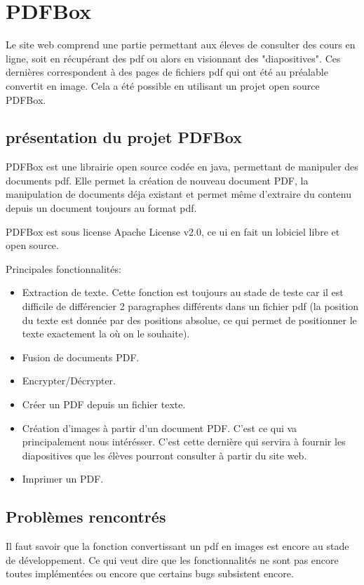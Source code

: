 \chapter{PDFBox}
    Le site web comprend une partie permettant aux éleves de consulter des cours en ligne, 
soit en récupérant des pdf ou alors en visionnant des "diapositives". Ces dernières 
correspondent à des pages de fichiers pdf qui ont été au préalable convertit en image. 
Cela a été possible en utilisant un projet open source PDFBox.
	

	\section{présentation du projet PDFBox}
	PDFBox est une librairie open source codée en java, permettant de manipuler 
des documents pdf. Elle permet la création de nouveau document PDF, la manipulation 
de documents déja existant et permet même d'extraire du contenu depuis un document 
toujours au format pdf.

	PDFBox est sous license Apache License v2.0, ce ui en fait un lobiciel libre et open source.

	Principales fonctionnalités:
	\begin{itemize}
		\item Extraction de texte.
			Cette fonction est toujours au stade de teste car il est difficile de différencier 2 paragraphes différents dans un fichier pdf (la position du texte est donnée par des positions absolue, ce qui permet de positionner le texte exactement la où on le souhaite).  
		\item Fusion de documents PDF. 
		\item Encrypter/Décrypter.
		\item Créer un PDF depuis un fichier texte.
		\item Création d'images à partir d'un document PDF. C'est ce qui va 
              principalement nous intérésser. C'est cette dernière qui servira à 
              fournir les diapositives que les élèves pourront consulter à partir 
              du site web.
		\item Imprimer un PDF.
	\end{itemize}


	\section{Problèmes rencontrés}
		Il faut savoir que la fonction convertissant un pdf en images est encore
    au stade de développement. Ce qui veut dire que  les fonctionnalités ne sont 
    pas encore toutes implémentées ou encore que certains bugs subsistent encore.

